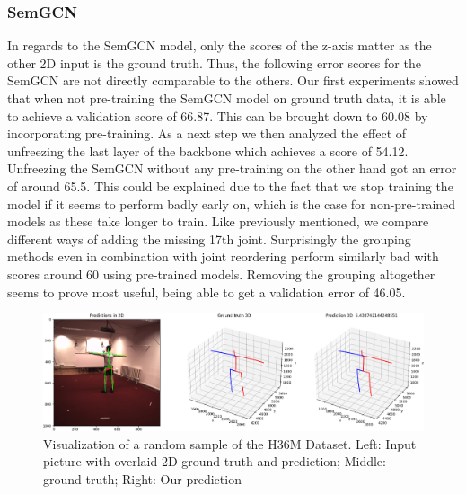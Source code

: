 \subsubsection*{SemGCN}
In regards to the SemGCN model, only the scores of the z-axis matter as the other 2D input is the ground truth.
Thus, the following error scores for the SemGCN are not directly comparable to the others. Our first experiments showed that when not pre-training the SemGCN model on ground truth data,
it is able to achieve a validation score of 66.87.
This can be brought down to 60.08 by incorporating pre-training.
As a next step we then analyzed the effect of unfreezing the last layer of the backbone which
achieves a score of 54.12.
Unfreezing the SemGCN without any pre-training on the other hand got an error of around 65.5.
This could be explained due to the fact that we stop training the model if it seems to perform badly
early on, which is the case for non-pre-trained models as these take longer to train.
Like previously mentioned, we compare different ways of adding the missing 17th joint.
Surprisingly the grouping methods even in combination with joint reordering perform similarly bad
with scores around 60 using pre-trained models. Removing the grouping altogether seems to prove most useful, being able to get a validation error of 46.05.



\begin{figure}
    \includegraphics[width=\columnwidth]{figures/tensorboard_1}
    \caption{Visualization of a random sample of the H36M Dataset.
    Left: Input picture with overlaid 2D ground truth and prediction; Middle: ground truth; Right: Our prediction}
    \label{tensorboard}
\end{figure}

